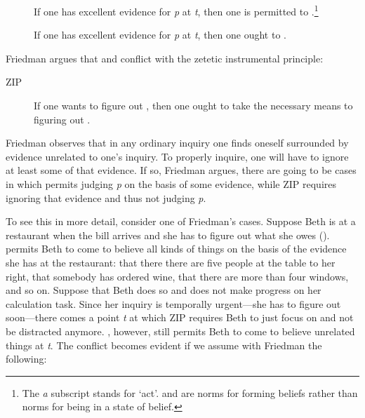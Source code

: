 \documentclass[12pt]{article}
\begin{document}
\begin{description}
    \item[\ep] If one has excellent evidence for \textit{p} at \textit{t}, then one is permitted to \jud{}.\footnote{The \textit{a} subscript stands for `act'. \ep{} and \eo{} are norms for forming beliefs rather than norms for being in a state of belief.}
    \item[\eo] If one has excellent evidence for \textit{p} at \textit{t}, then one ought to \jud{}.
\end{description}
%
Friedman argues that \ep{} and \eo{} conflict with the zetetic instrumental principle:

\begin{description}
    \item[ZIP] If one wants to figure out , then one ought to take the necessary means to figuring out .
\end{description}
%
Friedman observes that in any ordinary inquiry one finds oneself surrounded by evidence unrelated to one's inquiry. To properly inquire, one will have to ignore at least some of that evidence. If so, Friedman argues, there are going to be cases in which \ep{} permits judging \textit{p} on the basis of some evidence, while ZIP requires ignoring that evidence and thus not judging \textit{p}.

To see this in more detail, consider one of Friedman's cases. Suppose Beth is at a restaurant when the bill arrives and she has to figure out what she owes (). \ep{} permits Beth to come to believe all kinds of things on the basis of the evidence she has at the restaurant: that there there are five people at the table to her right, that somebody has ordered wine, that there are more than four windows, and so on. Suppose that Beth does so and does not make progress on her calculation task. Since her inquiry is temporally urgent---she has to figure out  soon---there comes a point \textit{t} at which ZIP requires Beth to just focus on  and not be distracted anymore. \ep{}, however, still permits Beth to come to believe unrelated things at \textit{t}. The conflict becomes evident if we assume with Friedman the following:
\end{document}
